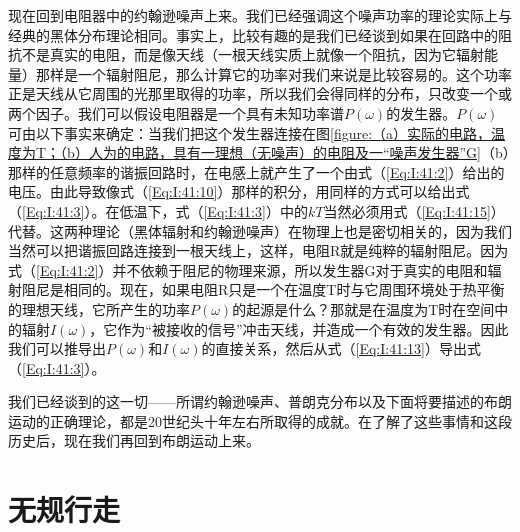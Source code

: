 现在回到电阻器中的约翰逊噪声上来。我们已经强调这个噪声功率的理论实际上与经典的黑体分布理论相同。事实上，比较有趣的是我们已经谈到如果在回路中的阻抗不是真实的电阻，而是像天线（一根天线实质上就像一个阻抗，因为它辐射能量）那样是一个辐射阻尼，那么计算它的功率对我们来说是比较容易的。这个功率正是天线从它周围的光那里取得的功率，所以我们会得同样的分布，只改变一个或两个因子。我们可以假设电阻器是一个具有未知功率谱$P(\omega)$的发生器。$P(\omega)$可由以下事实来确定：当我们把这个发生器连接在图\ref{figure:（a）实际的电路，温度为T；（b）人为的电路，具有一理想（无噪声）的电阻及一“噪声发生器”G}（b）那样的任意频率的谐振回路时，在电感上就产生了一个由式（\ref{Eq:I:41:2}）给出的电压。由此导致像式（\ref{Eq:I:41:10}）那样的积分，用同样的方式可以给出式（\ref{Eq:I:41:3}）。在低温下，式（\ref{Eq:I:41:3}）中的$kT$当然必须用式（\ref{Eq:I:41:15}）代替。这两种理论（黑体辐射和约翰逊噪声）在物理上也是密切相关的，因为我们当然可以把谐振回路连接到一根天线上，这样，电阻R就是纯粹的辐射阻尼。因为式（\ref{Eq:I:41:2}）并不依赖于阻尼的物理来源，所以发生器G对于真实的电阻和辐射阻尼是相同的。现在，如果电阻R只是一个在温度T时与它周围环境处于热平衡的理想天线，它所产生的功率$P(\omega)$的起源是什么？那就是在温度为T时在空间中的辐射$I(\omega)$，它作为“被接收的信号”冲击天线，并造成一个有效的发生器。因此我们可以推导出$P(\omega)$和$I(\omega)$的直接关系，然后从式（\ref{Eq:I:41:13}）导出式（\ref{Eq:I:41:3}）。

我们已经谈到的这一切——所谓约翰逊噪声、普朗克分布以及下面将要描述的布朗运动的正确理论，都是20世纪头十年左右所取得的成就。在了解了这些事情和这段历史后，现在我们再回到布朗运动上来。

\section{无规行走}


